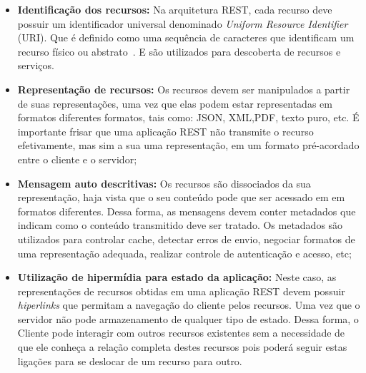  \begin{itemize}
    \item \textbf{Identificação dos recursos:} Na arquitetura REST, cada recurso deve possuir um identificador universal denominado \emph{Uniform Resource Identifier} (URI). Que é definido como uma sequência de caracteres que identificam um recurso físico ou abstrato~\cite{bernerslee2005uri}. E são utilizados para descoberta de recursos e serviços.
    \item	\textbf{Representação de recursos:} Os recursos devem ser manipulados a partir de suas representações, uma vez que elas podem estar representadas em formatos diferentes formatos, tais como: JSON, XML,PDF, texto puro, etc. É importante frisar que uma aplicação REST não transmite o recurso efetivamente, mas sim a sua uma representação, em um formato pré-acordado entre o cliente e o servidor;
    \item	\textbf{Mensagem auto descritivas:} Os recursos são dissociados da sua representação, haja vista que o seu conteúdo  pode que ser acessado em em formatos diferentes. Dessa forma, as mensagens devem conter metadados que indicam como o conteúdo transmitido deve ser tratado.  Os metadados são utilizados para controlar cache, detectar erros de envio, negociar formatos de uma representação adequada, realizar controle de autenticação e acesso, etc;
    \item	\textbf{Utilização de hipermídia para estado da aplicação:} Neste caso, as representações de recursos obtidas em uma aplicação REST devem possuir \emph{hiperlinks} que permitam a navegação do cliente pelos recursos. Uma vez que o servidor não pode  armazenamento de qualquer tipo de estado. Dessa forma, o Cliente pode interagir com outros recursos existentes sem a necessidade de que ele conheça a relação completa destes recursos pois poderá seguir estas ligações para se deslocar de um recurso para outro.


\end{itemize}

